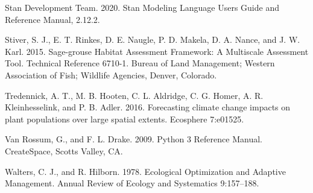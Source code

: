 \documentclass[
  12pt,
]{article}
\newlength{\cslhangindent}
\newenvironment{CSLReferences}[2] %
 {%
  \setlength{\parindent}{0pt}
  \ifodd #1 \everypar{\setlength{\hangindent}{\cslhangindent}}\ignorespaces\fi
  \ifnum #2 > 0
  \setlength{\parskip}{#2\baselineskip}
  \fi
 }%
 {}
\begin{document}
\begin{CSLReferences}{1}{0}
\leavevmode{}%
Stan Development Team. 2020. Stan {Modeling} {Language} {Users} {Guide} and {Reference} {Manual}, 2.12.2.

\leavevmode{}%
Stiver, S. J., E. T. Rinkes, D. E. Naugle, P. D. Makela, D. A. Nance, and J. W. Karl. 2015. Sage-grouse {Habitat} {Assessment} {Framework}: {A} {Multiscale} {Assessment} {Tool}. {Technical} {Reference} 6710-1. Bureau of Land Management; Western Association of Fish; Wildlife Agencies, Denver, Colorado.

\leavevmode{}%
Tredennick, A. T., M. B. Hooten, C. L. Aldridge, C. G. Homer, A. R. Kleinhesselink, and P. B. Adler. 2016. Forecasting climate change impacts on plant populations over large spatial extents. Ecosphere 7:e01525.

\leavevmode{}%
Van Rossum, G., and F. L. Drake. 2009. Python 3 {Reference} {Manual}. CreateSpace, Scotts Valley, CA.

\leavevmode{}%
Walters, C. J., and R. Hilborn. 1978. Ecological {Optimization} and {Adaptive} {Management}. Annual Review of Ecology and Systematics 9:157--188.

\end{CSLReferences}
\end{document}
